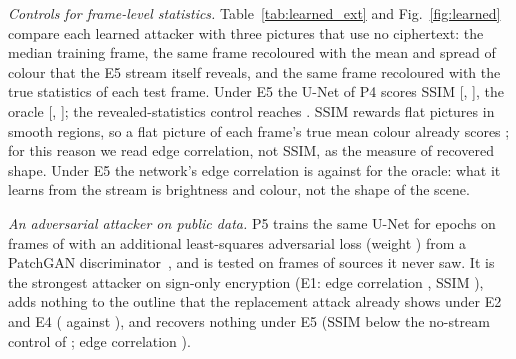\textit{Controls for frame-level statistics.} Table~\ref{tab:learned_ext} and Fig.~\ref{fig:learned} compare each learned attacker with three pictures that use no ciphertext: the median training frame, the same frame recoloured with the mean and spread of colour that the E5 stream itself reveals, and the same frame recoloured with the true statistics of each test frame. Under E5 the U-Net of P4 scores SSIM \LearnEfiveSsimBig{} [\LearnEfiveSsimLo, \LearnEfiveSsimHi], the oracle \CtrlTrueSsim{} [\CtrlTrueLo, \CtrlTrueHi]; the revealed-statistics control reaches \CtrlRevSsim. SSIM rewards flat pictures in smooth regions, so a flat picture of each frame's true mean colour already scores \FlatSsim; for this reason we read edge correlation, not SSIM, as the measure of recovered shape. Under E5 the network's edge correlation is \LearnEfiveEdgeBig{} against \CtrlTrueEdge{} for the oracle: what it learns from the stream is brightness and colour, not the shape of the scene.

\textit{An adversarial attacker on public data.} P5 trains the same U-Net for \PfiveEpochs{} epochs on \PfiveTrain{} frames of \PfiveCorpus{} with an additional least-squares adversarial loss (weight \PfiveAdv) from a PatchGAN discriminator~\cite{isola2017}, and is tested on \PfiveTest{} frames of \PfiveTestSrc{} sources it never saw. It is the strongest attacker on sign-only encryption (E1: edge correlation \PfiveEoneEdge, SSIM \PfiveEoneSsim), adds nothing to the outline that the replacement attack already shows under E2 and E4 (\PfiveEtwoFourEdge{} against \PfiveReplEtwoFourEdge), and recovers nothing under E5 (SSIM \PfiveEfiveSsim{} below the no-stream control of \PfiveCtrlSsim; edge correlation \PfiveEfiveEdge).

